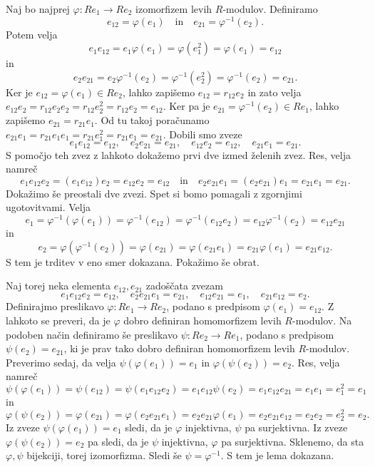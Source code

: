 \documentclass[a4paper, 12pt]{amsart}
\theoremstyle{definition} %
\theoremstyle{plain} %
\begin{document}
\proof
Naj bo najprej $\varphi : Re_1 \rightarrow Re_2$ izomorfizem levih $R$-modulov. Definiramo 
$$
e_{12} = \varphi(e_1) \quad \text{in} \quad e_{21} = \varphi^{-1}(e_2).
$$
Potem velja 
$$
e_1 e_{12} = e_1\varphi(e_1) = \varphi(e_1^2) = \varphi(e_1) = e_{12}
$$
in
$$
e_2 e_{21} = e_2\varphi^{-1}(e_2) = \varphi^{-1}(e_2^2) = \varphi^{-1}(e_2) = e_{21}.
$$
Ker je $e_{12} = \varphi (e_1) \in Re_2$, lahko zapišemo $e_{12} = r_{12}e_2$ in zato velja $e_{12}e_2 = r_{12}e_2 e_2 = r_{12}e_2^2 = r_{12}e_2 = e_{12}$. Ker pa je $e_{21} = \varphi^{-1}(e_2) \in Re_1$, lahko zapišemo $e_{21} = r_{21}e_1$. Od tu takoj poračunamo $e_{21}e_1 = r_{21}e_1e_1 = r_{21}e_1^2 = r_{21}e_1=e_{21}$. Dobili smo zveze
$$
e_1e_{12} = e_{12},\quad  e_2 e_{21} = e_{21}, \quad e_{12} e_2 = e_{12}, \quad e_{21} e_1 = e_{21}.
$$
S pomočjo teh zvez z lahkoto dokažemo prvi dve izmed želenih zvez. Res, velja namreč 
$$
e_1 e_{12} e_2 = (e_1 e_{12}) e_2 = e_{12} e_2 = e_{12}\quad \text{in}\quad e_2 e_{21}e_1 = (e_2 e_{21}) e_1 = e_{21}e_1 = e_{21}.
$$
Dokažimo še preostali dve zvezi. Spet si bomo pomagali z zgornjimi ugotovitvami. Velja
$$
e_1 = \varphi^{-1}(\varphi(e_1)) = \varphi^{-1}(e_{12}) = \varphi^{-1}(e_{12} e_2) = e_{12} \varphi^{-1}(e_2) = e_{12} e_{21}
$$
in
$$
e_2 = \varphi(\varphi^{-1}(e_2)) = \varphi(e_{21}) = \varphi(e_{21}e_1)=e_{21}\varphi(e_1) = e_{21} e_{12}.
$$
S tem je trditev v eno smer dokazana. Pokažimo še obrat.

Naj torej neka elementa $e_{12}, e_{21}$ zadoščata zvezam
$$
e_1 e_{12} e_2 = e_{12}, \quad e_2 e_{21} e_1 = e_{21}, \quad e_{12}e_{21} = e_1, \quad e_{21}e_{12} = e_2.
$$
Definirajmo preslikavo $\varphi : Re_1 \rightarrow Re_2$, podano s predpisom $\varphi(e_1) = e_{12}$. Z lahkoto se preveri, da je $\varphi$ dobro definiran homomorfizem levih $R$-modulov. Na podoben način definiramo še preslikavo $\psi:Re_2 \rightarrow Re_1$, podano s predpisom $\psi(e_2) = e_{21}$, ki je prav tako dobro definiran homomorfizem levih $R$-modulov.
Preverimo sedaj, da velja $\psi(\varphi(e_1)) = e_1$ in $\varphi(\psi(e_2)) = e_2$. Res, velja namreč
$$
\psi(\varphi(e_1)) = \psi(e_{12}) = \psi(e_1 e_{12}e_2) = e_1 e_{12}\psi(e_2) = e_1 e_{12} e_{21} = e_1 e_1 = e_1^2 = e_1
$$
in
$$
\varphi(\psi(e_2)) = \varphi(e_{21}) = \varphi(e_2 e_{21} e_1) = e_2 e_{21} \varphi(e_1) = e_2 e_{21} e_{12} = e_2 e_2 = e_2^2 = e_2. 
$$
Iz zveze $\psi(\varphi(e_1)) = e_1$ sledi, da je $\varphi$ injektivna, $\psi$ pa surjektivna. Iz zveze $\varphi(\psi(e_2)) = e_2$ pa sledi, da je $\psi$ injektivna, $\varphi$ pa surjektivna. Sklenemo, da sta $\varphi, \psi$ bijekciji, torej izomorfizma. Sledi še $\psi = \varphi^{-1}$. S tem je lema dokazana.
\endproof
\end{document}
